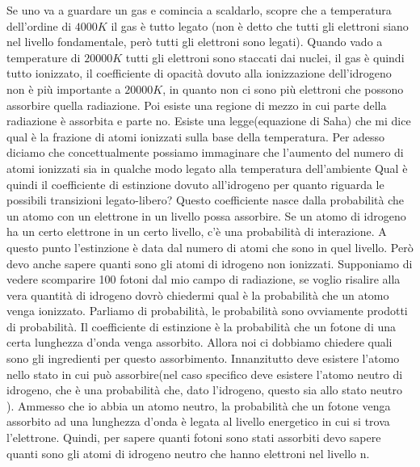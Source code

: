 \documentclass[a4paper,11pt]{article}
\begin{document}
\newline *
Se uno va a guardare un gas e comincia a scaldarlo, scopre che a temperatura dell'ordine di $4000K$ il gas è tutto legato (non è detto che tutti gli elettroni siano nel livello fondamentale, però tutti gli elettroni sono legati). Quando vado a temperature di $20000K$ tutti gli elettroni sono staccati dai nuclei, il gas è quindi tutto ionizzato, il coefficiente di opacità dovuto alla ionizzazione dell'idrogeno non è più importante a $20000K$, in quanto non ci sono più elettroni che possono assorbire quella radiazione. Poi esiste una regione di mezzo in cui parte della radiazione è assorbita e parte no.
\newline
Esiste una legge(equazione di Saha) che mi dice qual è la frazione di atomi ionizzati sulla base della temperatura. Per adesso diciamo che concettualmente possiamo immaginare che l'aumento del numero di atomi ionizzati sia in qualche modo legato alla temperatura dell'ambiente 
\newline
Qual è quindi il coefficiente di estinzione dovuto all'idrogeno per quanto riguarda le possibili transizioni legato-libero? Questo coefficiente nasce dalla probabilità che un atomo con un elettrone in un livello possa assorbire. Se un atomo di idrogeno ha un certo elettrone in un certo livello, c'è una probabilità di interazione. A questo punto l'estinzione è data dal numero di atomi che sono in quel livello. Però devo anche sapere quanti sono gli atomi di idrogeno non ionizzati. Supponiamo di vedere scomparire 100 fotoni dal mio campo di radiazione, se voglio risalire alla vera quantità di idrogeno dovrò chiedermi qual è la probabilità che un atomo venga ionizzato.
\newline
Parliamo di probabilità, le probabilità sono ovviamente prodotti di probabilità.
Il coefficiente di estinzione è la probabilità che un fotone di una certa lunghezza d'onda venga assorbito. Allora noi ci dobbiamo chiedere quali sono gli ingredienti per questo assorbimento.
\newline
Innanzitutto deve esistere l'atomo nello stato in cui può assorbire(nel caso specifico deve esistere l'atomo neutro di idrogeno, che è una probabilità che, 
dato l'idrogeno, questo sia allo stato neutro ). Ammesso che io abbia un atomo neutro, la probabilità che un fotone venga assorbito ad una lunghezza d'onda è legata al livello energetico in cui si trova l'elettrone. Quindi, per sapere quanti fotoni sono stati assorbiti devo sapere quanti sono gli atomi di idrogeno neutro che hanno elettroni nel livello n.
\newline
\end{document}
